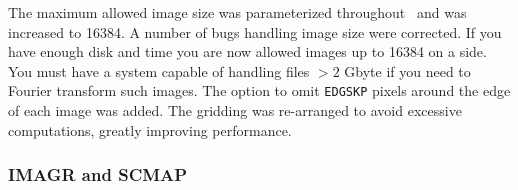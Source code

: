 \begin{description}
 The maximum allowed image size was parameterized
    throughout \AIPS\ and was increased to 16384.  A number of bugs
    handling image size were corrected.  If you have enough disk and
    time you are now allowed images up to 16384 on a side.  You must
    have a system capable of handling files $> 2$ Gbyte if you need to
    Fourier transform such images.
 The option to omit {\tt EDGSKP} pixels around the edge
    of each image was added.  The gridding was re-arranged to avoid
    excessive computations, greatly improving performance.
\end{description}
\eject

\subsubsection{IMAGR and SCMAP}

